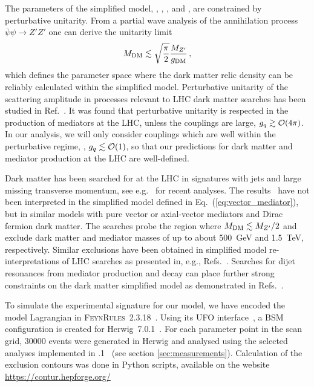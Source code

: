 \documentclass[floatfix]{article}
\begin{document}
The parameters of the simplified model, \GDM, \GQ, \MDM, and \MZP, are constrained by perturbative unitarity. 
From a partial wave analysis of the annihilation process $\overline{\psi}\psi \to Z' Z'$ one can derive the unitarity limit~\cite{Kahlhoefer:2015bea}
\begin{equation}
M_{\rm DM} \lesssim \sqrt{\frac{\pi}{2}} \frac{M_{Z^{\prime}}}{g_{\rm DM}}\,,
\end{equation}
which defines the parameter space where the dark matter relic density can be reliably calculated within the simplified model. 
Perturbative unitarity of the scattering amplitude in processes relevant to LHC dark matter searches has been studied in Ref.~\cite{Englert:2016joy}. 
It was found that perturbative unitarity is respected in the production of mediators at the LHC, unless 
the couplings are large, $g_{q} \gtrsim {\cal O}(4\pi)$. In our analysis, we will only consider couplings which are well within the 
perturbative regime, \GDM, $g_{q} \lesssim {\cal O}(1)$, so that our predictions for dark matter and mediator production at the LHC 
are well-defined. 

Dark matter has been searched for at the LHC in signatures with jets and large missing transverse momentum, see e.g.~\cite{Aaboud:2016tnv,CMS:2016tns} 
for recent analyses. 
The results~\cite{Aaboud:2016tnv,CMS:2016tns}  have not been interpreted in the simplified model defined in Eq.~(\ref{eq:vector_mediator}), but in 
similar models with pure vector or axial-vector mediators and Dirac fermion dark matter. The  searches probe the region where $M_{\rm DM} \lesssim M_{Z^{\prime}}/2$ 
and exclude dark matter and mediator masses of up to about 500~GeV and 1.5~TeV, respectively. Similar exclusions have been obtained in simplified 
model re-interpretations of LHC searches as presented in, e.g.,  Refs.~\cite{Kahlhoefer:2015bea, Heisig:2015ira}. Searches for dijet resonances from 
mediator production and decay can place further strong constraints on the dark matter simplified model as demonstrated in Refs.~\cite{Chala:2015ama,Fairbairn:2016iuf}. 

To simulate the experimental signature for our model, we have encoded the model Lagrangian in \textsc{FeynRules}~2.3.18~\cite{Alloul:2013bka}. Using its UFO interface~\cite{Degrande:2011ua},
a BSM configuration is created for Herwig~7.0.1~\cite{Bellm:2015jjp,Bahr:2008pv}. For each parameter point in the scan grid, 30000 events were generated in Herwig and 
analysed using the selected analyses implemented in  
 .1~\cite{Buckley:2010ar} (see section \ref{sec:measurements}). Calculation of the exclusion contours was done in Python scripts, available on the \Contur website \url{https://contur.hepforge.org/}
\end{document}
